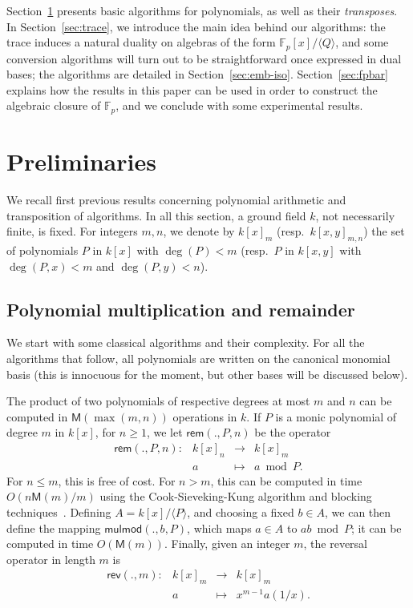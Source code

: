 \documentclass{sig-alternate}
\def\M {\ensuremath{\mathsf{M}}}
\def\F {\ensuremath{\mathbb{F}}}
\def\rem {\ensuremath{\mathsf{rem}}}
\def\mulmod {\ensuremath{\mathsf{mulmod}}}
\def\rev {\ensuremath{\mathsf{rev}}}
\newcounter{algo}
\newcommand{\ang}[1]{\langle#1\rangle}
\begin{document}
  Section~\ref{sec:prelim} presents basic
algorithms for polynomials, as well as their {\em transposes}.  In
Section~\ref{sec:trace}, we introduce the main idea behind our
algorithms: the trace induces a natural duality on algebras of the
form $\F_p[x]/\ang{Q}$, and some conversion algorithms will turn out
to be straightforward once expressed in dual bases; the algorithms are
detailed in Section~\ref{sec:emb-iso}. Section~\ref{sec:fpbar}
explains how the results in this paper can be used in order to
construct the algebraic closure of $\F_p$, and we conclude with some
experimental results.


\section{Preliminaries}\label{sec:prelim}

We recall first previous results concerning polynomial arithmetic and
transposition of algorithms. In all this section, a ground field $k$,
not necessarily finite, is fixed. For integers $m,n$, we denote by
$k[x]_m$ (resp.\ $k[x,y]_{m,n}$) the set of polynomials $P$ in $k[x]$
with $\deg(P) <m$ (resp.\ $P$ in $k[x,y]$ with $\deg(P,x) <m$ and
$\deg(P,y)<n$).


\subsection{Polynomial multiplication and remainder}

We start with some classical algorithms and their complexity. For all
the algorithms that follow, all polynomials are written on the
canonical monomial basis (this is innocuous for the moment, but other
bases will be discussed below).

The product of two polynomials of respective degrees at most $m$ and
$n$ can be computed in $\M(\max(m,n))$ operations in $k$.  If $P$ is a
monic polynomial of degree $m$ in $k[x]$, for $n \ge 1$, we let
$\rem(.,P,n)$ be the operator
$$
\begin{array}{cccc}
\rem(.,P,n): &k[x]_n& \to &k[x]_{m}\\
& a & \mapsto & a \bmod P.
\end{array}$$ 
For $n \le m$, this is free of cost. For $n > m$, this can be computed
in time $O(n\M(m)/m)$ using the Cook-Sieveking-Kung algorithm and
blocking techniques~\cite[Ch.~5.1.3]{Bostan10}. Defining
$A=k[x]/\ang{P}$, and choosing a fixed $b \in A$, we can then define
the mapping $\mulmod(.,b,P)$, which maps $a \in A$ to $ab \bmod P$; it
can be computed in time $O(\M(m))$. Finally, given an integer $m$, the
reversal operator in length $m$ is 
$$
\begin{array}{cccc}
\rev(.,m): &k[x]_m &\to& k[x]_m  \\
& a & \mapsto & x^{m-1} a(1/x).
\end{array}$$ 
\end{document}
